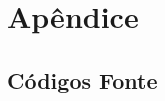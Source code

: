 \chapter{Apêndice}
\label{chapter:apendice}

\section{Códigos Fonte}
\label{section:codigos_fonte}


